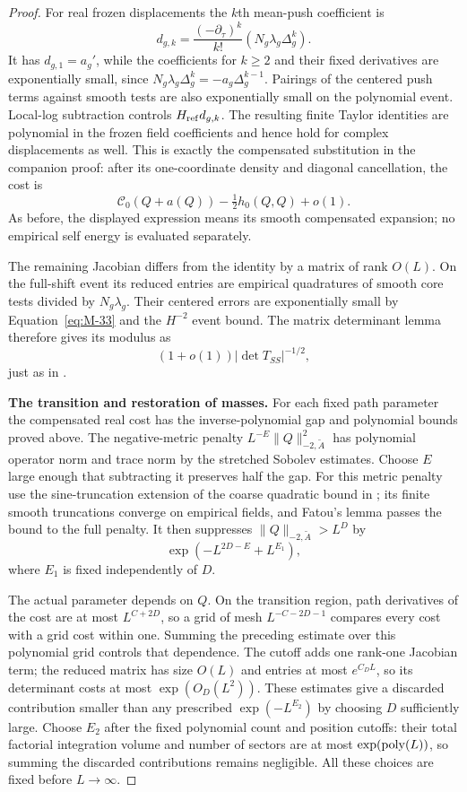 \begin{proof}
For real frozen displacements the $k$th mean-push coefficient is
\[
 d_{g,k}=\frac{(-\partial_\tau)^k}{k!}
              (N_g\lambda_g\Delta_g^k).
\]
It has $d_{g,1}=a_g'$, while the coefficients for $k\ge2$ and their
fixed derivatives are exponentially small, since
$N_g\lambda_g\Delta_g^k=-a_g\Delta_g^{k-1}$.
Pairings of the centered push terms against smooth tests are also
exponentially small on the polynomial event. Local-log subtraction
controls $H_{\rm ref}d_{g,k}$. The resulting finite Taylor identities
are polynomial in the frozen field coefficients and hence hold for
complex displacements as well. This is exactly the compensated
substitution in the companion proof: after its one-coordinate density
and diagonal cancellation, the cost is
\[
 \mathscr C_0(Q+a(Q))-\tfrac12h_0(Q,Q)+o(1).
\]
As before, the displayed expression means its smooth compensated
expansion; no empirical self energy is evaluated separately.

The remaining Jacobian differs from the identity by a matrix of rank
$O(L)$. On the full-shift event its reduced entries are empirical
quadratures of smooth core tests divided by $N_g\lambda_g$.
Their centered errors are exponentially small by
Equation~\eqref{eq:M-33} and the $H^{-2}$ event bound. The matrix
determinant lemma therefore gives its modulus as
\[
 (1+o(1))|\det T_{SS}|^{-1/2},
\]
just as in \cite[Lemma~5.2]{Electric}.

\par\smallskip\noindent\textbf{The transition and restoration of masses.}
For each fixed path parameter the compensated real cost has the
inverse-polynomial gap and polynomial bounds proved above. The
negative-metric penalty $L^{-E}\|Q\|_{-2,\widetilde A}^2$ has
polynomial operator norm and trace norm by the stretched Sobolev
estimates. Choose $E$ large enough that subtracting it preserves
half the gap. For this metric penalty use the sine-truncation extension
of the coarse quadratic bound in \cite[Lemma~4.4]{Electric}; its finite
smooth truncations converge on empirical fields, and Fatou's lemma
passes the bound to the full penalty. It then suppresses
$\|Q\|_{-2,\widetilde A}>L^D$ by
\[
 \exp(-L^{2D-E}+L^{E_1}),
\]
where $E_1$ is fixed independently of $D$.

The actual parameter depends on $Q$. On the transition region,
path derivatives of the cost are at most $L^{C+2D}$, so a grid of
mesh $L^{-C-2D-1}$ compares every cost with a grid cost within one.
Summing the preceding estimate over this polynomial grid controls
that dependence. The cutoff adds one rank-one Jacobian term; the
reduced matrix has size $O(L)$ and entries at most $e^{C_DL}$,
so its determinant costs at most $\exp(O_D(L^2))$. These estimates
give a discarded contribution smaller than any prescribed
$\exp(-L^{E_2})$ by choosing $D$ sufficiently large. Choose $E_2$
after the fixed polynomial count and position cutoffs: their total
factorial integration volume and number of sectors are at most
$\exp({\rm poly}(L))$, so summing the discarded contributions
remains negligible. All these choices are fixed before $L\to\infty$.


\end{proof}
